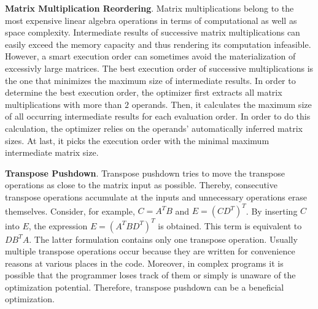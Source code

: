 \textbf{Matrix Multiplication Reordering}. Matrix multiplications belong to the most expensive linear algebra operations in terms of computational as well as space complexity. 
Intermediate results of successive matrix multiplications can easily exceed the memory capacity and thus rendering its computation infeasible. However, a smart execution order can sometimes avoid the materialization of excessivly large matrices. 
The best execution order of successive multiplications is the one that minimizes the maximum size of intermediate results.
In order to determine the best execution order, the optimizer first extracts all matrix multiplications with more than $2$ operands.
Then, it calculates the maximum size of all occurring intermediate results for each evaluation order.
In order to do this calculation, the optimizer relies on the operands' automatically inferred matrix sizes.
At last, it picks the execution order with the minimal maximum intermediate matrix size.

\textbf{Transpose Pushdown}. Transpose pushdown tries to move the transpose operations as close to the matrix input as possible.
Thereby, consecutive transpose operations accumulate at the inputs and unnecessary operations erase themselves.
Consider, for example, $C = A^TB$ and $E = (CD^T)^T$.
By inserting $C$ into $E$, the expression $E=(A^T BD^T)^T$ is obtained. 
This term is equivalent to $DB^T A$. 
The latter formulation contains only one transpose operation. 
Usually multiple transpose operations occur because they are written for convenience reasons at various places in the code. 
Moreover, in complex programs it is possible that the programmer loses track of them or simply is unaware of the optimization potential. 
Therefore, transpose pushdown can be a beneficial optimization.


